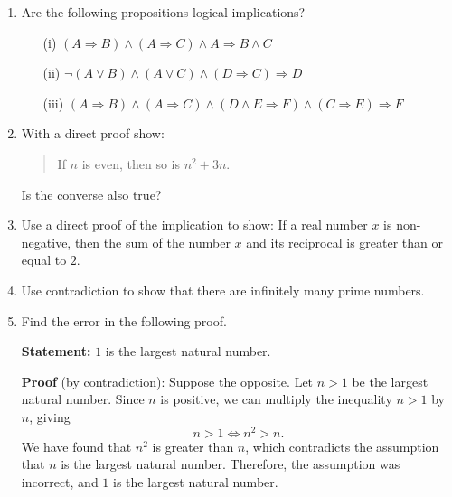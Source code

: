 \documentclass[11pt,paper=b5,footinclude,headinclude]{scrbook} %
\theoremstyle{remark}
\theoremstyle{definition} %
\theoremstyle{theorem} %
\begin{document}
\begin{enumerate}[resume, label=\textbf{Problem \arabic*.}]


\item Are the following propositions logical implications?
\begin{enumerate}
\item[(i)] $(A \Rightarrow B ) \wedge (A \Rightarrow C) \wedge A \Rightarrow B \wedge C$
\item[(ii)] $\neg (A \vee B) \wedge (A\vee C) \wedge (D\Rightarrow C) \Rightarrow D$
\item[(iii)] $(A\Rightarrow B) \wedge (A\Rightarrow C) \wedge (D\wedge E \Rightarrow F) \wedge (C\Rightarrow E) \Rightarrow F$
\end{enumerate}

\item With a direct proof show:
\begin{quote}
    If $n$ is even, then so is $n^2 +3n$.
\end{quote}
Is the converse also true?






    \item Use a direct proof of the implication to show: If a real number $x$ is non-negative, then the sum of the number $x$ and its reciprocal is greater than or equal to $2$.


    \item Use contradiction to show that there are infinitely many prime numbers.


    \item Find the error in the following proof.

    \textbf{Statement:} $1$ is the largest natural number.

    \textbf{Proof} (by contradiction):
    Suppose the opposite. Let $n > 1$ be the largest natural number. Since $n$ is positive, we can multiply the inequality $n > 1$ by $n$, giving
    \[
    n > 1 \Leftrightarrow n^2 > n.
    \]
    We have found that $n^2$ is greater than $n$, which contradicts the assumption that $n$ is the largest natural number. Therefore, the assumption was incorrect, and $1$ is the largest natural number.


\end{enumerate}
\end{document}
